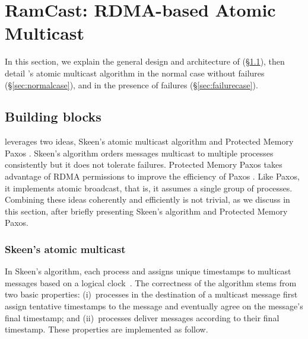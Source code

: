 
\section{RamCast: RDMA-based Atomic Multicast}
\label{sec:rdma-atomic-multicast}

In this section, we explain the general design and architecture of \libname (\S\ref{sec:overview}), then detail \libname's atomic multicast algorithm in the normal case without failures (\S\ref{sec:normalcase}), and in the presence of failures (\S\ref{sec:failurecase}).

\subsection{Building blocks}
\label{sec:overview}

\libname leverages two ideas, Skeen's atomic multicast algorithm \cite{BJ87b} and Protected Memory Paxos \cite{Aguilera2019}.
Skeen's algorithm orders messages multicast to multiple processes consistently but it does not tolerate failures.
Protected Memory Paxos takes advantage of RDMA permissions to improve the efficiency of Paxos \cite{L98}. 
Like Paxos, it implements atomic broadcast, that is, it assumes a single group of processes.
Combining these ideas coherently and efficiently is not trivial, as we discuss in this section,
after briefly presenting Skeen's algorithm and Protected Memory Paxos.


\subsubsection{Skeen's atomic multicast}

In Skeen's algorithm, each process and assigns unique timestamps to multicast messages based on a logical clock~\cite{Lam78}.
The correctness of the algorithm stems from two basic properties:
(i)~processes in the destination of a multicast message first assign tentative timestamps to the message and eventually agree on the message's final timestamp; and
(ii)~processes deliver messages according to their final timestamp.
These properties are implemented as follow.

